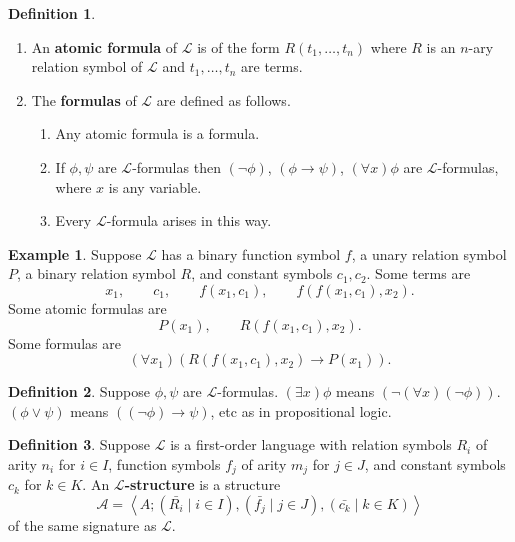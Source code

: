 \documentclass{article}
\newcommand{\rb}[1]{\left( #1 \right)}
\newcommand{\ab}[1]{\left\langle #1 \right\rangle}
\newcommand{\notb}[1]{\rb{\neg #1}}
\newcommand{\orb}[2]{\rb{#1 \lor #2}}
\newcommand{\impb}[2]{\rb{#1 \rightarrow #2}}
\newcommand{\fab}[1]{\rb{\forall #1}}
\newcommand{\teb}[1]{\rb{\exists #1}}
\theoremstyle{definition}\newtheorem{definition}{Definition}[subsection]
\theoremstyle{definition}\newtheorem{remark}[definition]{Remark}
\theoremstyle{definition}\newtheorem*{example}{Example}
\theoremstyle{definition}\newtheorem*{note}{Note}
\begin{document}

\begin{definition}
\hfill
\begin{enumerate}
\item An \textbf{atomic formula} of $ \mathcal{L} $ is of the form $ R\rb{t_1, \dots, t_n} $ where $ R $ is an $ n $-ary relation symbol of $ \mathcal{L} $ and $ t_1, \dots, t_n $ are terms.
\item The \textbf{formulas} of $ \mathcal{L} $ are defined as follows.
\begin{enumerate}
\item Any atomic formula is a formula.
\item If $ \phi, \psi $ are $ \mathcal{L} $-formulas then $ \notb{\phi} $, $ \impb{\phi}{\psi} $, $ \fab{x}\phi $ are $ \mathcal{L} $-formulas, where $ x $ is any variable.
\item Every $ \mathcal{L} $-formula arises in this way.
\end{enumerate}
\end{enumerate}
\end{definition}

\begin{example}
Suppose $ \mathcal{L} $ has a binary function symbol $ f $, a unary relation symbol $ P $, a binary relation symbol $ R $, and constant symbols $ c_1, c_2 $. Some terms are
$$ x_1, \qquad c_1, \qquad f\rb{x_1, c_1}, \qquad f\rb{f\rb{x_1, c_1}, x_2}. $$
Some atomic formulas are
$$ P\rb{x_1}, \qquad R\rb{f\rb{x_1, c_1}, x_2}. $$
Some formulas are
$$ \fab{x_1}\impb{R\rb{f\rb{x_1, c_1}, x_2}}{P\rb{x_1}}. $$
\end{example}

\begin{definition}
Suppose $ \phi, \psi $ are $ \mathcal{L} $-formulas. $ \teb{x}\phi $ means $ \notb{\fab{x}\notb{\phi}} $. $ \orb{\phi}{\psi} $ means $ \impb{\notb{\phi}}{\psi} $, etc as in propositional logic.
\end{definition}

\begin{definition}
Suppose $ \mathcal{L} $ is a first-order language with relation symbols $ R_i $ of arity $ n_i $ for $ i \in I $, function symbols $ f_j $ of arity $ m_j $ for $ j \in J $, and constant symbols $ c_k $ for $ k \in K $. An \textbf{$ \mathcal{L} $-structure} is a structure
$$ \mathcal{A} = \ab{A; \rb{\bar{R_i} \mid i \in I}, \rb{\bar{f_j} \mid j \in J}, \rb{\bar{c_k} \mid k \in K}} $$
of the same signature as $ \mathcal{L} $.
\end{definition}
\end{document}
